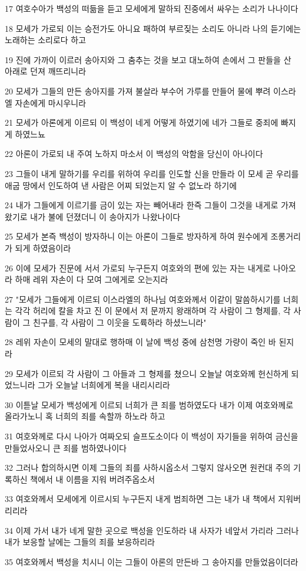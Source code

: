 \par 17 여호수아가 백성의 떠듦을 듣고 모세에게 말하되 진중에서 싸우는 소리가 나나이다
\par 18 모세가 가로되 이는 승전가도 아니요 패하여 부르짖는 소리도 아니라 나의 듣기에는 노래하는 소리로다 하고
\par 19 진에 가까이 이르러 송아지와 그 춤추는 것을 보고 대노하여 손에서 그 판들을 산 아래로 던져 깨뜨리니라
\par 20 모세가 그들의 만든 송아지를 가져 불살라 부수어 가루를 만들어 물에 뿌려 이스라엘 자손에게 마시우니라
\par 21 모세가 아론에게 이르되 이 백성이 네게 어떻게 하였기에 네가 그들로 중죄에 빠지게 하였느뇨
\par 22 아론이 가로되 내 주여 노하지 마소서 이 백성의 악함을 당신이 아나이다
\par 23 그들이 내게 말하기를 우리를 위하여 우리를 인도할 신을 만들라 이 모세 곧 우리를 애굽 땅에서 인도하여 낸 사람은 어찌 되었는지 알 수 없노라 하기에
\par 24 내가 그들에게 이르기를 금이 있는 자는 빼어내라 한즉 그들이 그것을 내게로 가져왔기로 내가 불에 던졌더니 이 송아지가 나왔나이다
\par 25 모세가 본즉 백성이 방자하니 이는 아론이 그들로 방자하게 하여 원수에게 조롱거리가 되게 하였음이라
\par 26 이에 모세가 진문에 서서 가로되 누구든지 여호와의 편에 있는 자는 내게로 나아오라 하매 레위 자손이 다 모여 그에게로 오는지라
\par 27 "모세가 그들에게 이르되 이스라엘의 하나님 여호와께서 이같이 말씀하시기를 너희는 각각 허리에 칼을 차고 진 이 문에서 저 문까지 왕래하며 각 사람이 그 형제를, 각 사람이 그 친구를, 각 사람이 그 이웃을 도륙하라 하셨느니라"
\par 28 레위 자손이 모세의 말대로 행하매 이 날에 백성 중에 삼천명 가량이 죽인 바 된지라
\par 29 모세가 이르되 각 사람이 그 아들과 그 형제를 쳤으니 오늘날 여호와께 헌신하게 되었느니라 그가 오늘날 너희에게 복을 내리시리라
\par 30 이튿날 모세가 백성에게 이르되 너희가 큰 죄를 범하였도다 내가 이제 여호와께로 올라가노니 혹 너희의 죄를 속할까 하노라 하고
\par 31 여호와께로 다시 나아가 여짜오되 슬프도소이다 이 백성이 자기들을 위하여 금신을 만들었사오니 큰 죄를 범하였나이다
\par 32 그러나 합의하시면 이제 그들의 죄를 사하시옵소서 그렇지 않사오면 원컨대 주의 기록하신 책에서 내 이름을 지워 버려주옵소서
\par 33 여호와께서 모세에게 이르시되 누구든지 내게 범죄하면 그는 내가 내 책에서 지워버리리라
\par 34 이제 가서 내가 네게 말한 곳으로 백성을 인도하라 내 사자가 네앞서 가리라 그러나 내가 보응할 날에는 그들의 죄를 보응하리라
\par 35 여호와께서 백성을 치시니 이는 그들이 아론의 만든바 그 송아지를 만들었음이더라

